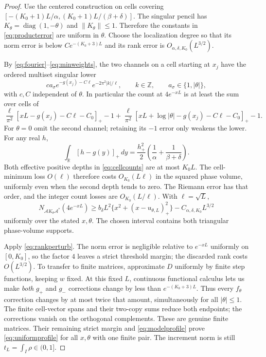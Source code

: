 \documentclass[11pt]{article}
\numberwithin{equation}{section}
\newcommand{\R}{\mathbb R}
\newcommand{\cA}{\mathcal A}
\newcommand{\diag}{\operatorname{diag}}
\begin{document}
\begin{proof}
Use the centered construction on cells covering
$[-(K_0+1)L/\alpha,(K_0+1)L/(\beta+\delta)]$.
The singular pencil has $K_\theta=\diag(1,-\theta)$ and
$\|K_\theta\|\le1$. Therefore the constants in
\eqref{eq:producterror} are uniform in $\theta$. Choose the localization
degree so that its norm error is below $C e^{-(K_0+3)L}$ and its rank
error is $O_{\alpha,\delta,K_0}(L^{3/2})$.

By \eqref{eq:fourier}--\eqref{eq:minweights}, the two channels on a
cell starting at $x_j$ have the ordered multiset singular lower
\[
 c a_\sigma e^{-g(x_j)-C\ell}e^{-2\pi^2|k|/\ell},
 \qquad k\in\mathbb Z,\qquad a_\sigma\in\{1,|\theta|\},
\]
with $c,C$ independent of $\theta$. In particular the count at
$4e^{-xL}$ is at least the sum over cells of
\begin{equation}\label{eq:cellcounts}
 \frac\ell{\pi^2}[xL-g(x_j)-C\ell-C_0]_+-1
 +\frac\ell{\pi^2}[xL+\log|\theta|-g(x_j)-C\ell-C_0]_+-1.
\end{equation}
For $\theta=0$ omit the second channel; retaining its $-1$ error only
weakens the lower. For any real $h$,
\[
 \int_\R[h-g(y)]_+\,dy
 =\frac{h_+^2}{2}
       \left(\frac1\alpha+\frac1{\beta+\delta}\right).
\]
Both effective positive depths in \eqref{eq:cellcounts} are at most
$K_0L$. The cell-minimum loss $O(\ell)$ therefore costs
$O_{K_0}(L\ell)$ in the squared phase volume, uniformly even when the
second depth tends to zero. The Riemann error has that order, and
the integer count losses are $O_{K_0}(L/\ell)$. With $\ell=\sqrt L$,
\begin{equation}\label{eq:modelprofile}
 N_{\cA K_\theta\cA^*}(4e^{-xL})
 \ge b_\delta L^2\{x^2+(x-u_{\theta,L})_+^2\}
                          -C_{\alpha,\delta,K_0}L^{3/2}
\end{equation}
uniformly over the stated $x,\theta$. The chosen interval contains
both triangular phase-volume supports.

Apply \eqref{eq:rankperturb}. The norm error is negligible relative
to $e^{-xL}$ uniformly on $[0,K_0]$, so the factor $4$ leaves a
strict threshold margin; the discarded rank costs $O(L^{3/2})$.
To transfer to finite matrices, approximate $D$ uniformly by finite
step functions, keeping $w$ fixed. At this fixed $L$, continuous
functional calculus lets us make \emph{both} $g_+$ and $g_-$ corrections
change by less than $e^{-(K_0+3)L}$. Thus every $f_\theta$ correction
changes by at most twice that amount, simultaneously for all
$|\theta|\le1$. The finite cell-vector spans and their two-copy sums
reduce both endpoints; the corrections vanish on the orthogonal
complements. These are genuine finite matrices. Their remaining
strict margin and \eqref{eq:modelprofile} prove
\eqref{eq:uniformprofile} for all $x,\theta$ with one finite pair.
The increment norm is still $t_L=\int_I\rho\in(0,1]$.
\end{proof}
\end{document}
